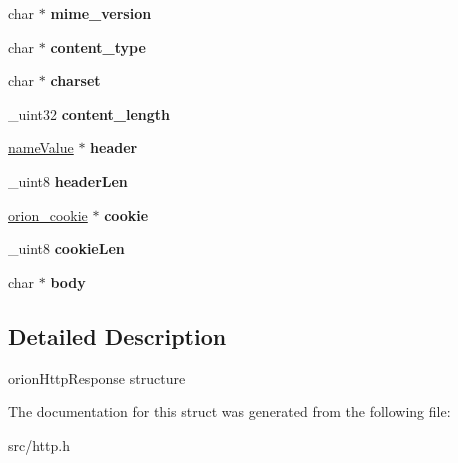 \begin{DoxyCompactItemize}
\item 
\hypertarget{structorion__httpResponse_aad2b284eabf64b4c613acdf1b0d96543}{
char $\ast$ {\bfseries mime\_\-version}}
\label{structorion__httpResponse_aad2b284eabf64b4c613acdf1b0d96543}

\item 
\hypertarget{structorion__httpResponse_a734f987d6f2823800d0b6a2a9bb2d26a}{
char $\ast$ {\bfseries content\_\-type}}
\label{structorion__httpResponse_a734f987d6f2823800d0b6a2a9bb2d26a}

\item 
\hypertarget{structorion__httpResponse_a53126c4ea065b647fe1115ef35d7028d}{
char $\ast$ {\bfseries charset}}
\label{structorion__httpResponse_a53126c4ea065b647fe1115ef35d7028d}

\item 
\hypertarget{structorion__httpResponse_a2b8ff190c94e8e1b5e61d4905b21a28c}{
\_\-uint32 {\bfseries content\_\-length}}
\label{structorion__httpResponse_a2b8ff190c94e8e1b5e61d4905b21a28c}

\item 
\hypertarget{structorion__httpResponse_a45c1160f05035286bc499eddda03be68}{
\hyperlink{structnameValue}{nameValue} $\ast$ {\bfseries header}}
\label{structorion__httpResponse_a45c1160f05035286bc499eddda03be68}

\item 
\hypertarget{structorion__httpResponse_a5c760fb95aca110d0561fac710de3509}{
\_\-uint8 {\bfseries headerLen}}
\label{structorion__httpResponse_a5c760fb95aca110d0561fac710de3509}

\item 
\hypertarget{structorion__httpResponse_ae687f288a074e0fa0e6f9ca6e44991e1}{
\hyperlink{structorion__cookie}{orion\_\-cookie} $\ast$ {\bfseries cookie}}
\label{structorion__httpResponse_ae687f288a074e0fa0e6f9ca6e44991e1}

\item 
\hypertarget{structorion__httpResponse_a3ad10dbd47b57b04729706ca96a9d2fe}{
\_\-uint8 {\bfseries cookieLen}}
\label{structorion__httpResponse_a3ad10dbd47b57b04729706ca96a9d2fe}

\item 
\hypertarget{structorion__httpResponse_a8e5d8dbe1389410747dd858b7be77128}{
char $\ast$ {\bfseries body}}
\label{structorion__httpResponse_a8e5d8dbe1389410747dd858b7be77128}

\end{DoxyCompactItemize}


\subsection{Detailed Description}
orionHttpResponse structure 

The documentation for this struct was generated from the following file:\begin{DoxyCompactItemize}
\item 
src/http.h\end{DoxyCompactItemize}
